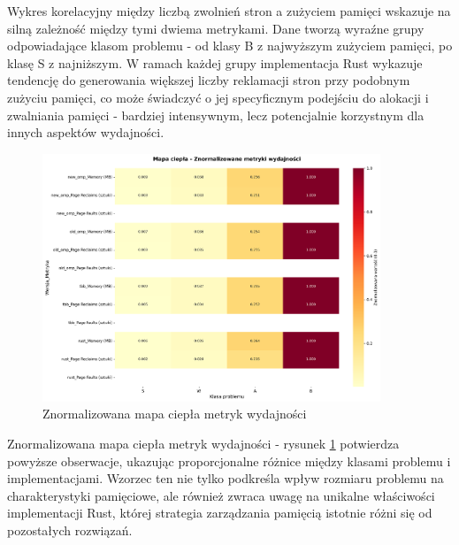 Wykres korelacyjny między liczbą zwolnień stron a zużyciem pamięci wskazuje na silną zależność między tymi dwiema metrykami. Dane tworzą wyraźne grupy odpowiadające klasom problemu - od klasy B z najwyższym zużyciem pamięci, po klasę S z najniższym. W ramach każdej grupy implementacja Rust wykazuje tendencję do generowania większej liczby reklamacji stron przy podobnym zużyciu pamięci, co może świadczyć o jej specyficznym podejściu do alokacji i zwalniania pamięci - bardziej intensywnym, lecz potencjalnie korzystnym dla innych aspektów wydajności.
\begin{figure}[H]
    \centering
    \includegraphics[width=0.9\textwidth]{analiza/images/parallel/is/x86/chart_03_heatmap.png}
    \caption{Znormalizowana mapa ciepła metryk wydajności}
    \label{is_heatmap_wydajnosci_x86}
\end{figure}
Znormalizowana mapa ciepła metryk wydajności - rysunek \ref{is_heatmap_wydajnosci_x86} potwierdza powyższe obserwacje, ukazując proporcjonalne różnice między klasami problemu i implementacjami. Wzorzec ten nie tylko podkreśla wpływ rozmiaru problemu na charakterystyki pamięciowe, ale również zwraca uwagę na unikalne właściwości implementacji Rust, której strategia zarządzania pamięcią istotnie różni się od pozostałych rozwiązań.

